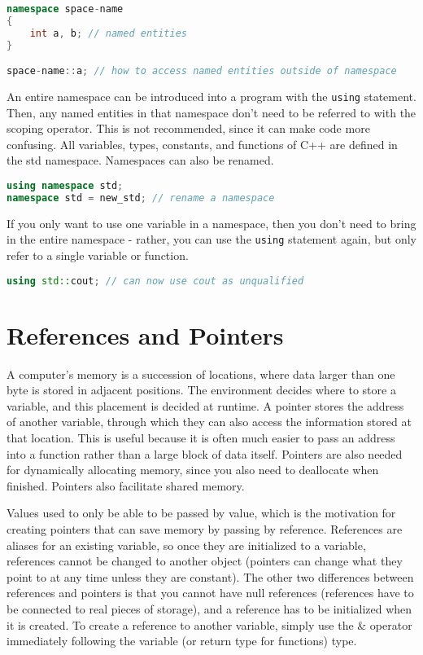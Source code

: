 \documentclass[10pt]{article}
\begin{document}
\begin{lstlisting}[language=C++]
namespace space-name
{
    int a, b; // named entities
}

space-name::a; // how to access named entities outside of namespace
\end{lstlisting}

An entire namespace can be introduced into a program with the \texttt{using} statement. Then, any named entities in that namespace don't need to be referred to with the scoping operator. This is not recommended, since it can make code more confusing. All variables, types, constants, and functions of C++ are defined in the std namespace. Namespaces can also be renamed. 

\begin{lstlisting}[language=C++]
using namespace std;
namespace std = new_std; // rename a namespace
\end{lstlisting}

If you only want to use one variable in a namespace, then you don't need to bring in the entire namespace - rather, you can use the \texttt{using} statement again, but only refer to a single variable or function.

\begin{lstlisting}[language=C++]
using std::cout; // can now use cout as unqualified
\end{lstlisting}

\section{References and Pointers}

A computer's memory is a succession of locations, where data larger than one byte is stored in adjacent positions. The environment decides where to store a variable, and this placement is decided at runtime. A pointer stores the address of another variable, through which they can also access the information stored at that location. This is useful because it is often much easier to pass an address into a function rather than a large block of data itself. Pointers are also needed for dynamically allocating memory, since you also need to deallocate when finished. Pointers also facilitate shared memory. 

Values used to only be able to be passed by value, which is the motivation for creating pointers that can save memory by passing by reference. References are aliases for an existing variable, so once they are initialized to a variable, references cannot be changed to another object (pointers can change what they point to at any time unless they are constant). The other two differences between references and pointers is that you cannot have null references (references have to be connected to real pieces of storage), and a reference has to be initialized when it is created. To create a reference to another variable, simply use the \& operator immediately following the variable (or return type for functions) type.
\end{document}
